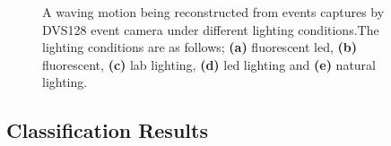 \begin{figure}[htb]%
    \centering
    \qquad
    \qquad
    \qquad
    \qquad
    \caption{A waving motion being reconstructed from events captures by DVS128 event camera under different lighting conditions.The lighting conditions are as follows; \textbf{(a)} fluorescent led, \textbf{(b)} fluorescent, \textbf{(c)} lab lighting, \textbf{(d)} led lighting and \textbf{(e)} natural lighting.}%
    \label{fig:wave_in_lightings_reconstructions}%
\end{figure}

\subsection{Classification Results}

